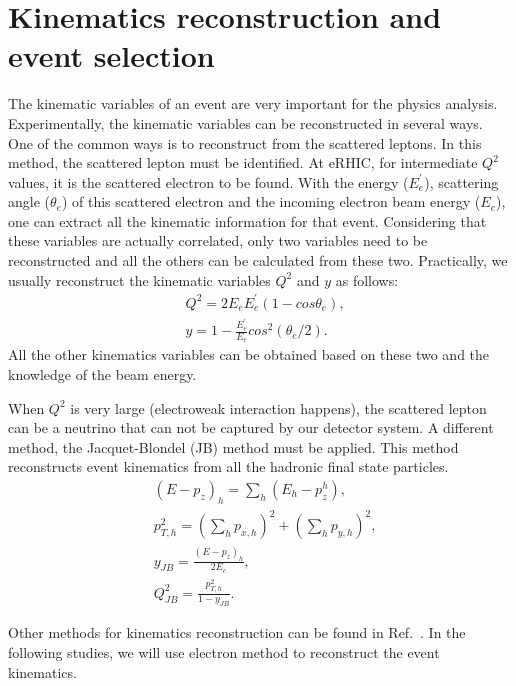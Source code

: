 \section{Kinematics reconstruction and event selection}
The kinematic variables of an event are very important for the physics analysis.
Experimentally, the kinematic variables can be reconstructed in several ways.
One of the common ways is to reconstruct from the scattered leptons. In this
method, the scattered lepton must be identified. At eRHIC, for intermediate
$Q^{2}$ values, it is the scattered electron to be found. With the energy
($E^{'}_{e}$), scattering angle ($\theta_{e}$) of this scattered electron and
the incoming electron beam energy ($E_{e}$), one can extract all the kinematic
information for that event. Considering that these variables are actually
correlated, only two variables need to be reconstructed and all the others can
be calculated from these two. Practically, we usually reconstruct the kinematic
variables $Q^{2}$ and $y$ as follows:
\begin{align}
& Q^{2}=2E_{e}E^{'}_{e}(1-cos\theta_{e}), \nonumber \\ 
& y=1-\frac{E^{'}_{e}}{E_{e}}cos^{2}(\theta_{e}/2).
\label{eqn:electr_method}
\end{align}
All the other kinematics variables can be obtained based on these two and
the knowledge of the beam energy. 

When $Q^{2}$ is very large  (electroweak interaction happens), the scattered
lepton can be a neutrino that can not be captured by our detector system. A
different method, the Jacquet-Blondel (JB) method must be applied. This method
reconstructs event kinematics from all the hadronic final state particles.
\begin{align}
& (E-p_{z})_{h} = \sum_{h}(E_{h}-p_{z}^{h}), \nonumber \\ 
& p_{T,h}^{2} = (\sum_{h}p_{x,h})^{2}+(\sum_{h}p_{y,h})^{2}, \nonumber \\ 
& y_{JB}=\frac{(E-p_{z})_{h}}{2E_{e}}, \nonumber \\ 
& Q_{JB}^{2}=\frac{p_{T,h}^{2}}{1-y_{JB}}.
\end{align}

Other methods for kinematics reconstruction can be found in
Ref.~\cite{Blumlein:2012bf}. In the following studies, we will use electron
method to reconstruct the event kinematics. 


